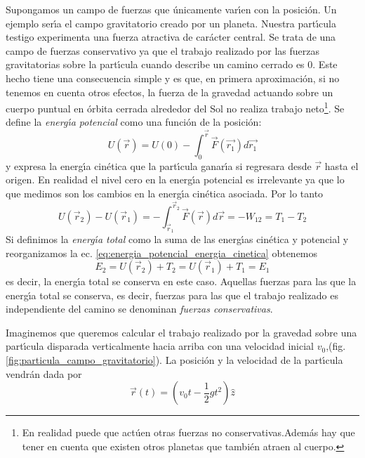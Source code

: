 Supongamos un campo de fuerzas que \'unicamente var\'\i{}en con la posici\'on. Un ejemplo ser\'\i{}a el campo gravitatorio creado por un planeta. Nuestra part\'\i{}cula testigo experimenta una fuerza atractiva de car\'acter central. Se trata de una campo de fuerzas conservativo ya que el trabajo realizado por las fuerzas gravitatorias sobre la part\'\i{}cula cuando describe un camino cerrado es $0$. Este hecho tiene una consecuencia simple y es que, en primera aproximaci\'on, si no tenemos en cuenta otros efectos, la fuerza de la gravedad actuando sobre un cuerpo puntual en \'orbita cerrada alrededor del Sol no realiza trabajo neto\footnote{En realidad puede que act\'uen otras fuerzas no conservativas.Adem\'as hay que tener en cuenta que existen otros planetas que tambi\'en atraen al cuerpo.}. Se define la \emph{energ\'\i{}a potencial} como una funci\'on de la posici\'on:
\begin{equation}
U(\vec{r})=U(0)-\int_0^{\vec{r}} \vec{F}(\vec{r_1})d\vec{r_1}
\label{eq:energia_potencial}
\end{equation}
y expresa la energ\'\i{}a cin\'etica que la part\'\i{}cula ganar\'\i{}a si regresara desde $\vec{r}$ hasta el origen. En realidad el nivel cero en la energ\'\i{}a potencial es irrelevante ya que lo que medimos son los cambios en la energ\'\i{}a cin\'etica asociada. Por lo tanto
\begin{equation}
U(\vec{r}_2)-U(\vec{r}_1)=-\int_{\vec{r}_1}^{\vec{r}_2} \vec{F}(\vec{r})d\vec{r}=-W_{12}=T_1-T_2
\label{eq:energia_potencial_energia_cinetica}
\end{equation}
Si definimos la \emph{energ\'\i{}a total} como la suma de las energ\'\i{}as cin\'etica y potencial y reorganizamos la ec. \ref{eq:energia_potencial_energia_cinetica} obtenemos
\begin{equation}
E_2=U(\vec{r}_2)+T_2=U(\vec{r}_1)+T_1=E_1
\label{eq:conservacion_energia_total}
\end{equation}
es decir, la energ\'\i{}a total se conserva en este caso. Aquellas fuerzas para las que la energ\'\i{}a total se conserva, es decir, fuerzas para las que el trabajo realizado es independiente del camino se denominan \emph{fuerzas conservativas}.

Imaginemos que queremos calcular el trabajo realizado por la gravedad sobre una part\'\i{}cula disparada verticalmente hacia arriba con una velocidad inicial $v_{0}$,(fig. \ref{fig:particula_campo_gravitatorio}). La posici\'on y la velocidad de la part\'\i{}cula vendr\'an dada por
\begin{equation}
\vec{r}(t)=\left(v_{0}t-\frac{1}{2}gt^2\right)\hat{z}
\label{eq:particula_vertical_1}
\end{equation}

